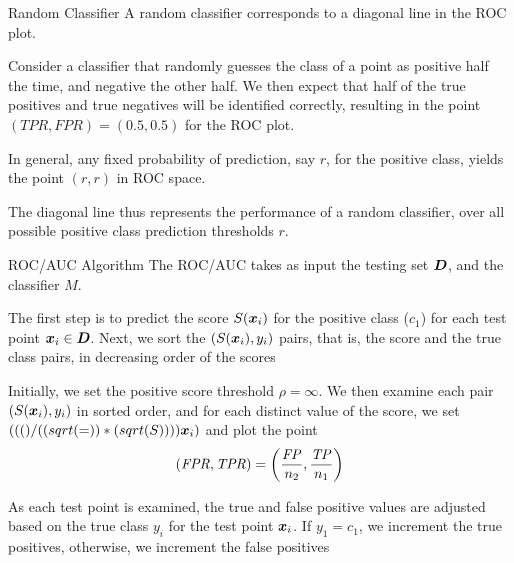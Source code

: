 \begin{frame}{Random Classif\/{i}er} 
A random
classif\/{i}er corresponds to a diagonal line in the ROC plot. 


\medskip
Consider a classif\/{i}er that randomly guesses the class of a
point as positive half the time, and negative the other half.  We
then expect that half of the true positives and true negatives
will be identif\/{i}ed correctly, resulting in the point $(\mathit{TPR}, \mathit{FPR}) =
(0.5, 0.5)$ for the ROC plot. 

\medskip
In
general, any f\/{i}xed probability of prediction, say $r$, for the
positive class, yields the point $(r,r)$ in ROC space.  

\medskip
The
diagonal line thus represents the performance of a random
classif\/{i}er, over all possible positive class prediction thresholds
$r$.  
\end{frame}




\begin{frame}{ROC/AUC Algorithm}
The ROC/AUC takes as
input the testing set $\bD$, and the classif\/{i}er $M$. 

\medskip
The f\/{i}rst
step is to predict the score $S(\bx_i)$ for the positive class
($c_1$) for each test point $\bx_i \in \bD$. Next, we sort the
$(S(\bx_i), y_i)$ pairs, that is, the score and the true class
pairs, in decreasing order of the scores

\medskip
Initially, we set the
positive score threshold $\rho = \infty$.  We then
examine each pair $(S(\bx_i),
y_i)$ in sorted order, and for each distinct value of the score,
we set $\rho = S(\bx_i)$ and plot the point
$$(\mathit{FPR}, \mathit{TPR}) = \lB(\frac{\mathit{FP}}{n_2}, \frac{\mathit{TP}}{n_1}\rB)$$%

\medskip
As each test point is
examined, the true and false positive values are adjusted based on
the true class $y_i$ for the test point $\bx_i$. If $y_1 = c_1$,
we increment the true positives, otherwise, we increment the false
positives

\end{frame}



